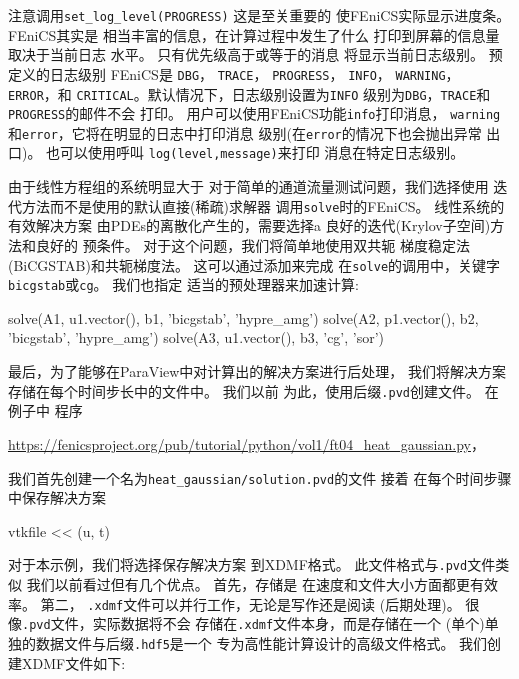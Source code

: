 \begin{notice}[日志级别和FEniCS中的打印]
注意调用\verb!set_log_level(PROGRESS)! 这是至关重要的
使FEniCS实际显示进度条。 FEniCS其实是
相当丰富的信息，在计算过程中发生了什么
打印到屏幕的信息量取决于当前日志
水平。 只有优先级高于或等于的消息
将显示当前日志级别。 预定义的日志级别
FEniCS是
\texttt{DBG}，
\texttt{TRACE}，
\texttt{PROGRESS}，
\texttt{INFO}，
\texttt{WARNING}，
\texttt{ERROR}，和
\texttt{CRITICAL}。默认情况下，日志级别设置为\texttt{INFO}
级别为\texttt{DBG}，\texttt{TRACE}和\texttt{PROGRESS}的邮件不会
打印。 用户可以使用FEniCS功能\texttt{info}打印消息，
\texttt{warning}和\texttt{error}，它将在明显的日志中打印消息
级别(在\texttt{error}的情况下也会抛出异常
出口)。 也可以使用呼叫 \texttt{log(level,message)}来打印
消息在特定日志级别。
\end{notice}

由于线性方程组的系统明显大于
对于简单的通道流量测试问题，我们选择使用
迭代方法而不是使用的默认直接(稀疏)求解器
调用\texttt{solve}时的FEniCS。 线性系统的有效解决方案
由PDEs的离散化产生的，需要选择a
良好的迭代(Krylov子空间)方法和良好的
预条件。 对于这个问题，我们将简单地使用双共轭
梯度稳定法(BiCGSTAB)和共轭梯度法。 这可以通过添加来完成
在\texttt{solve}的调用中，关键字\texttt{bicgstab}或\texttt{cg}。 我们也指定
适当的预处理器来加速计算:


\begin{python}
solve(A1, u1.vector(), b1, 'bicgstab', 'hypre_amg')
solve(A2, p1.vector(), b2, 'bicgstab', 'hypre_amg')
solve(A3, u1.vector(), b3, 'cg', 'sor')
\end{python}

最后，为了能够在ParaView中对计算出的解决方案进行后处理，
我们将解决方案存储在每个时间步长中的文件中。 我们以前
为此，使用后缀\texttt{.pvd}创建文件。 在例子中
程序
\begin{center}
\url{https://fenicsproject.org/pub/tutorial/python/vol1/ft04_heat_gaussian.py}，
\end{center}
我们首先创建一个名为\verb!heat_gaussian/solution.pvd!的文件 接着
在每个时间步骤中保存解决方案
\begin{python}
vtkfile << (u, t)
\end{python}

对于本示例，我们将选择保存解决方案
到XDMF格式。 此文件格式与\texttt{.pvd}文件类似
我们以前看过但有几个优点。 首先，存储是
在速度和文件大小方面都更有效率。 第二，
\texttt{.xdmf}文件可以并行工作，无论是写作还是阅读
(后期处理)。 很像\texttt{.pvd}文件，实际数据将不会
存储在\texttt{.xdmf}文件本身，而是存储在一个
(单个)单独的数据文件与后缀\texttt{.hdf5}是一个
专为高性能计算设计的高级文件格式。
我们创建XDMF文件如下:

